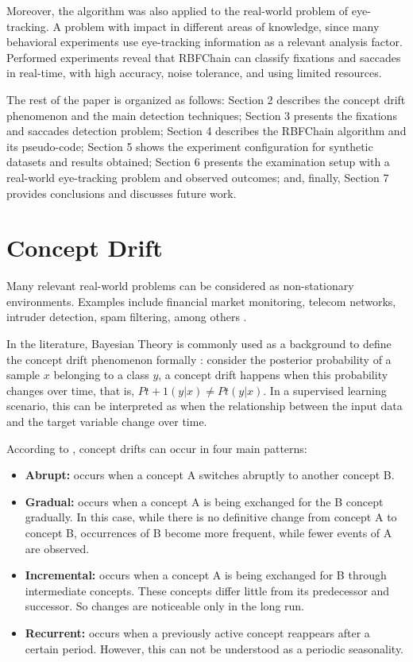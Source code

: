 \documentclass[preprint,12pt]{elsarticle}
\begin{document}
Moreover, the algorithm was also applied to the real-world problem of eye-tracking.
A problem with impact in different areas of knowledge, since many behavioral experiments use eye-tracking information as a relevant analysis factor.
Performed experiments reveal that RBFChain can classify fixations and saccades in real-time, with high accuracy, noise tolerance, and using limited resources.

The rest of the paper is organized as follows:
Section 2 describes the concept drift phenomenon and the main detection techniques;
Section 3 presents the fixations and saccades detection problem;
Section 4 describes the RBFChain algorithm and its pseudo-code;
Section 5 shows the experiment configuration for synthetic datasets  and results obtained;
Section 6 presents the examination setup with a real-world eye-tracking problem and observed outcomes; and, finally, Section 7 provides conclusions
and discusses future work.

\section{Concept Drift}
\label{sec:concept_drift}

Many relevant real-world problems can be considered as non-stationary environments.
Examples include financial market monitoring, telecom networks, intruder detection, spam filtering, among others \cite{Gama:2014:DAF:2670967.2670971}.

In the literature, Bayesian Theory is commonly used as a background to define the concept drift phenomenon formally \cite{Elwell:2011}: consider the posterior probability of a sample $x$ belonging to a class $y$, a concept drift happens when this probability changes over time, that is, $Pt + 1 (y | x) \neq Pt (y | x)$. In a supervised learning scenario, this can be interpreted as when the relationship between the input data and the target variable change over time.

According to \cite{tsymbal2004problem, Gama:2014:DAF:2670967.2670971}, concept drifts can occur in four main patterns:

\begin{itemize}
    \item \textbf{Abrupt:} occurs when a concept A switches abruptly to another concept B.
    \item \textbf{Gradual:} occurs when a concept A is being exchanged for the B concept gradually. In this case, while there is no definitive change from concept A to concept B, occurrences of B become more frequent, while fewer events of A are observed.
    \item \textbf{Incremental:} occurs when a concept A is being exchanged for B through intermediate concepts.  These concepts differ little from its predecessor and successor. So changes are noticeable only in the long run.
    \item \textbf{Recurrent:} occurs when a previously active concept reappears after a certain period. However, this can not be understood as a periodic seasonality.
\end{itemize}
\end{document}
